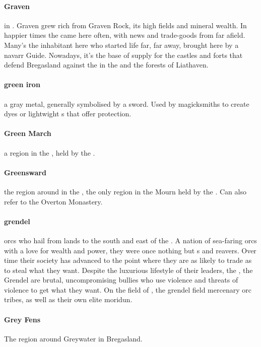 \paragraph{Graven}  in . Graven grew rich from Graven Rock, its high fields and mineral wealth. In happier times the  came here often, with news and trade-goods from far afield. Many's the inhabitant here who started life far, far away, brought here by a navarr Guide. Nowadays, it’s the base of supply for the castles and forts that defend Bregasland against the  in the  and the forests of Liathaven.
\paragraph{green iron} a gray metal, generally symbolised by a sword. Used by magicksmiths to create dyes or lightwight s that offer protection.
\paragraph{Green March} a region in the , held by the .
\paragraph{Greensward} the region around  in the , the only region in the Mourn held by the . Can also refer to the Overton Monastery.
\paragraph{grendel} orcs who hail from lands to the south and east of the . A nation of sea-faring orcs with a love for wealth and power, they were once nothing but s and reavers. Over time their society has advanced to the point where they are as likely to trade as to steal what they want. Despite the luxurious lifestyle of their leaders, the , the Grendel are brutal, uncompromising bullies who use violence and threats of violence to get what they want. On the field of , the grendel field mercenary orc tribes, as well as their own elite moridun.
\paragraph{Grey Fens} The region around Greywater in Bregasland.
